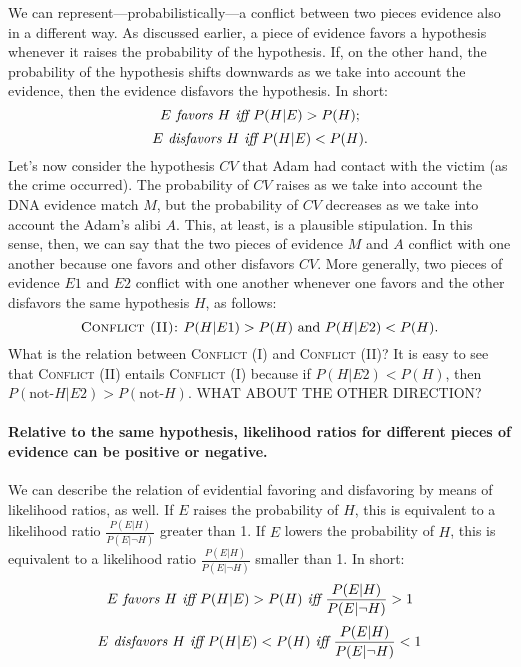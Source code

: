 \documentclass[10pt]{article}
\begin{document}
We can represent---probabilistically---a conflict between two pieces 
evidence also in a different way. As discussed earlier, a piece of evidence favors a hypothesis whenever it raises the probability of the hypothesis. 
If, on the other hand, the probability of the hypothesis shifts downwards as we take into account the evidence, then the evidence disfavors the hypothesis. 
In short:
%
\[\textit{\text{$E$ favors $H$} iff }  P(H|E)> P(H);\]
%
%
\[\textit{\text{$E$ disfavors $H$} iff }  P(H|E)< P(H).\]
%
Let's now consider the hypothesis $CV$ that Adam had contact with the victim (as the crime occurred). 
The probability of $CV$ raises as we take into account the DNA evidence match $M$, but the probability of $CV$ decreases as we take 
into account the Adam's alibi $A$. This, at least, is a plausible stipulation. 
In this sense, then, we can say that the two pieces of evidence $M$ and $A$ conflict with one another because one 
favors and other disfavors $CV$.
%
%
More generally, two pieces of evidence $E1$ and $E2$ conflict 
with one another whenever one favors and the other disfavors the same hypothesis 
$H$, as follows:
%
\[\textsc{Conflict (II): } P(H| E1)>P(H) \text{ and } P(H|E2)<P(H).\]
%
What is the relation between \textsc{Conflict (I)}  and \textsc{Conflict (II)}?
 It is easy to see that \textsc{Conflict (II)} entails \textsc{Conflict (I)} because if $P(H|E2)<P(H)$, then 
 $P(\text{not-}H|E2)>P(\text{not-}H)$.  WHAT ABOUT THE OTHER DIRECTION?
 
\paragraph{Relative to the same hypothesis, likelihood ratios for different pieces of evidence can be positive or negative.}

We can describe the relation of evidential favoring and disfavoring by means of likelihood ratios, as well.
If $E$ raises the probability of $H$,  this is equivalent to a likelihood ratio
$\frac{P(E|H)}{P(E | \neg H)}$ greater than 1. If $E$ lowers the probability of $H$, this is equivalent to a likelihood ratio
$\frac{P(E|H)}{P(E | \neg H)}$ smaller than 1. %
In short:
%
\[\textit{\text{$E$ favors $H$} iff }   P(H|E)> P(H) \textit{ iff }\frac{P(E|H)}{P(E|\neg H)}>1\]
%
%
\[\textit{\text{$E$ disfavors $H$} iff }   P(H|E)< P(H) \textit{ iff } \frac{P(E|H)}{P(E|\neg H)}<1\]
%
\end{document}
